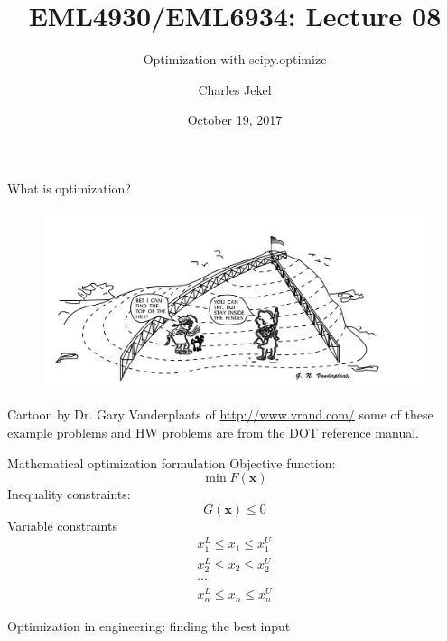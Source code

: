 \documentclass[10pt]{beamer}
\title{EML4930/EML6934: Lecture 08}
\subtitle{Optimization with scipy.optimize }
\date{October 19, 2017}
\author{Charles Jekel}
\begin{document}
\maketitle

\begin{frame}{What is optimization?}
\begin{figure}
\includegraphics[width=1.0\textwidth]{figs/opt1.png}
\end{figure}

Cartoon by Dr. Gary Vanderplaats of \url{http://www.vrand.com/} some of these example problems and HW problems are from the DOT reference manual.
\end{frame}

\begin{frame}{Mathematical optimization formulation}
Objective function:
\begin{equation}
\min F(\bm{x})
\end{equation}
Inequality constraints:
\begin{equation}
G(\bm{x}) \leq 0
\end{equation}
Variable constraints
\begin{align}
x_1^L \leq x_1 \leq x_1^U \\
x_2^L \leq x_2 \leq x_2^U \\
\cdots \\
x_n^L \leq x_n \leq x_n^U 
\end{align}
\end{frame}

\begin{frame}{Optimization in engineering: finding the best input}
\end{frame}
\end{document}
